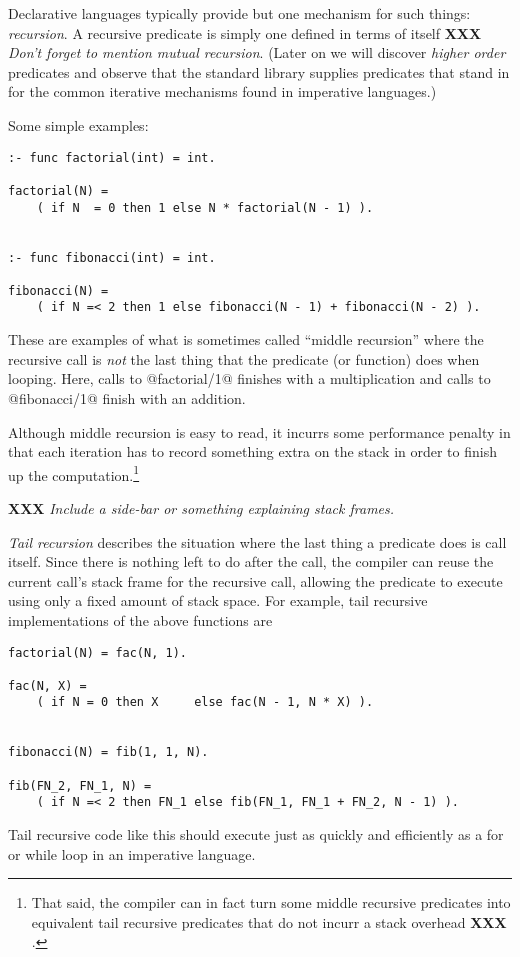 \documentclass[a4paper,11pt,notitlepage,onecolumn]{article}
\newcommand{\XXX}[1]%
{{\small\textbf{XXX} \emph{#1}}}
\begin{document}
Declarative languages typically provide but one mechanism for
such things: \emph{recursion}.  A recursive predicate is simply one
defined in terms of itself \XXX{Don't forget to mention mutual
recursion}.  (Later on we will discover \emph{higher order} predicates
and observe that the standard library supplies predicates that stand in
for the common iterative mechanisms found in imperative languages.)

Some simple examples:
\begin{verbatim}
:- func factorial(int) = int.

factorial(N) =
    ( if N  = 0 then 1 else N * factorial(N - 1) ).


:- func fibonacci(int) = int.

fibonacci(N) =
    ( if N =< 2 then 1 else fibonacci(N - 1) + fibonacci(N - 2) ).
\end{verbatim}
These are examples of what is sometimes called ``middle
recursion'' where the recursive call is \emph{not} the last thing
that the predicate (or function) does when looping.  Here,
calls to @factorial/1@ finishes with a multiplication and calls
to @fibonacci/1@ finish with an addition.

Although middle recursion is easy to read, it incurrs some
performance penalty in that each iteration has to record
something extra on the stack in order to finish up the
computation.\footnote{That said, the compiler can in fact turn some
middle recursive predicates into equivalent tail recursive
predicates that do not incurr a stack overhead \XXX{}.}

\XXX{Include a side-bar or something explaining stack frames.}

\emph{Tail recursion} describes the situation where the last thing a
predicate does is call itself.  Since there is nothing left to
do after the call, the compiler can reuse the current call's
stack frame for the recursive call, allowing the predicate to
execute using only a fixed amount of stack space.  For
example, tail recursive implementations of the above
functions are
\begin{verbatim}
factorial(N) = fac(N, 1).

fac(N, X) =
    ( if N = 0 then X     else fac(N - 1, N * X) ).


fibonacci(N) = fib(1, 1, N).

fib(FN_2, FN_1, N) =
    ( if N =< 2 then FN_1 else fib(FN_1, FN_1 + FN_2, N - 1) ).
\end{verbatim}
Tail recursive code like this should execute just as quickly
and efficiently as a for or while loop in an imperative
language.
\end{document}
